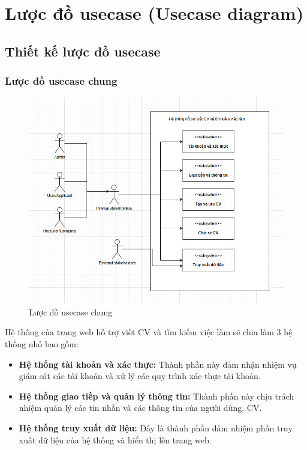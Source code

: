  \section{Lược đồ usecase (Usecase diagram)}
 \subsection{Thiết kế lược đồ usecase}
 
\subsubsection{Lược đồ usecase chung}

\begin{figure}[H]
	\centering
    \includegraphics[scale = 0.6]{img/general_usecase.png}
    \caption{Lược đồ usecase chung}
\end{figure}

Hệ thống của trang web hỗ trợ viết CV và tìm kiếm việc làm sẽ chia làm 3 hệ thống nhỏ bao gồm:
\begin{itemize}
    \item \textbf{Hệ thống tài khoản và xác thực:} Thành phần này đảm nhận nhiệm vụ giám sát các tài khoản và xử lý các quy trình xác thực tài khoản.
    \item \textbf{Hệ thống giao tiếp và quản lý thông tin:} Thành phần này chịu trách nhiệm quản lý các tin nhắn và các thông tin của người dùng, CV.
    \item \textbf{Hệ thống truy xuất dữ liệu:} Đây là thành phần đảm nhiệm phần truy xuất dữ liệu của hệ thống và hiển thị lên trang web.
\end{itemize}



